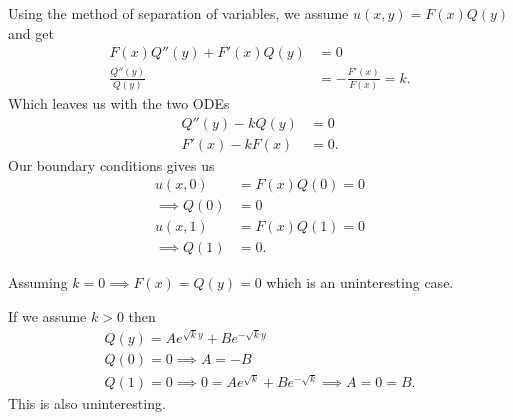 \begin{derivation}
  Using the method of separation of variables, we assume $u(x,y) = F(x) Q(y)$ and get
  \begin{align*}
    F(x) Q''(y) + F'(x) Q(y) &= 0 \\
    \frac{Q''(y)}{Q(y)} &= - \frac{F'(x)}{F(x)} = k
  .\end{align*}
  Which leaves us with the two ODEs
  \begin{align*}
    Q''(y) - kQ(y) &= 0 \\
    F'(x) - k F(x) &= 0
  .\end{align*}
  Our boundary conditions gives us
  \begin{align*}
    u(x,0) &= F(x) Q(0) = 0 \\
    \implies Q(0) &= 0 \\
    u(x,1) &= F(x) Q(1) = 0 \\
    \implies Q(1) &= 0
  .\end{align*}

  Assuming $k = 0 \implies F(x) = Q(y) = 0$ which is an uninteresting case.
  
  If we assume $k > 0$ then
  \begin{gather*}
    Q(y) = A e^{\sqrt{k}y} + B e^{- \sqrt{k}y} \\
    Q(0) = 0 \implies A = - B \\
    Q(1) = 0 \implies 0 = A e^{\sqrt{k}} + Be^{-\sqrt{k}} \implies A = 0 = B
  .\end{gather*}
  This is also uninteresting.


\end{derivation}

